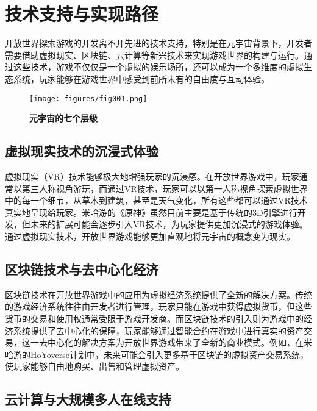 \documentclass[UTF8]{ctexart}
\begin{document}
	
	
	
\section{技术支持与实现路径}

开放世界探索游戏的开发离不开先进的技术支持，特别是在元宇宙背景下，开发者需要借助虚拟现实、区块链、云计算等新兴技术来实现游戏世界的构建与运行\cite{zhang2021blockchain}。通过这些技术，游戏不仅仅是一个虚拟的娱乐场所，还可以成为一个多维度的虚拟生态系统，玩家能够在游戏世界中感受到前所未有的自由度与互动体验。

\begin{figure}[htbp] %
	\centering %
	\texttt{[image: figures/fig001.png]} %
	\caption{\textbf{元宇宙的七个层级}} %
	\label{fig:1} %
\end{figure}


\subsection{虚拟现实技术的沉浸式体验}

虚拟现实（VR）技术能够极大地增强玩家的沉浸感。在开放世界游戏中，玩家通常以第三人称视角游玩，而通过VR技术，玩家可以以第一人称视角探索虚拟世界中的每一个细节，从草木到建筑，甚至是天气变化，所有这些都可以通过VR技术真实地呈现给玩家\cite{boellstorff2021coming}。米哈游的《原神》虽然目前主要是基于传统的3D引擎进行开发，但未来的扩展可能会逐步引入VR技术，为玩家提供更加沉浸式的游戏体验。通过虚拟现实技术，开放世界游戏能够更加直观地将元宇宙的概念变为现实。

\subsection{区块链技术与去中心化经济}

区块链技术在开放世界游戏中的应用为虚拟经济系统提供了全新的解决方案。传统的游戏经济系统往往由开发者进行管理，玩家只能在游戏中获得虚拟货币，但这些货币的交易和使用权通常受限于游戏开发商。而区块链技术的引入则为游戏中的经济系统提供了去中心化的保障，玩家能够通过智能合约在游戏中进行真实的资产交易，这一去中心化的解决方案为开放世界游戏带来了全新的商业模式\cite{zhang2021blockchain}。例如，在米哈游的HoYoverse计划中，未来可能会引入更多基于区块链的虚拟资产交易系统，使玩家能够自由地购买、出售和管理虚拟资产\cite{mihoyo2022starrail}。

\subsection{云计算与大规模多人在线支持}
\end{document}
